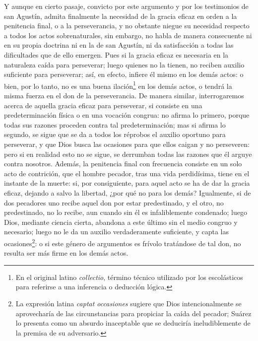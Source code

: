 \documentclass{article}
\begin{document}
Y aunque en cierto pasaje, convicto por este argumento y por los testimonios de san
Agustín, admita finalmente la necesidad de la gracia eficaz en orden a la penitencia
final, o a la perseverancia, y no obstante niegue su necesidad respecto a todos los
actos sobrenaturales, sin embargo, no habla de manera consecuente ni en su propia
doctrina ni en la de san Agustín, ni da satisfacción a todas las dificultades que de
ello emergen. Pues si la gracia eficaz es necesaria en la naturaleza caída para
perseverar; luego quienes no la tienen, no reciben auxilio suficiente para perseverar;
así, en efecto, infiere él mismo en los demás actos: o bien, por lo tanto, no es una
buena ilación\footnote{En el original latino \textit{collectio}, término técnico
utilizado por los escolásticos para referirse a una inferencia o deducción lógica.} en
los demás actos, o tendrá la misma fuerza en el don de la perseverancia. De manera
similar, interrogaremos acerca de aquella gracia eficaz para perseverar, si consiste en
una predeterminación física o en una vocación congrua: no afirma lo primero, porque
todas sus razones proceden contra tal predeterminación; mas si afirma lo segundo, se
sigue que se da a todos los réprobos el auxilio oportuno para perseverar, y que Dios
busca las ocasiones para que ellos caigan y no perseveren: pero si en realidad esto no
se sigue, se derrumban todas las razones que él arguye contra nosotros. Además, la
penitencia final con frecuencia consiste en un solo acto de contrición, que el hombre
pecador, tras una vida perdidísima, tiene en el instante de la muerte: si, por
consiguiente, para aquel acto se ha de dar la gracia eficaz, dejando a salvo la
libertad, ¿por qué no para los demás? Igualmente, si de dos pecadores uno recibe aquel
don por estar predestinado, y el otro, no predestinado, no lo recibe, aun cuando sin él
es infaliblemente condenado; luego Dios, mediante ciencia cierta, abandona a este último
sin el medio congruo y necesario; luego no le da un auxilio verdaderamente suficiente,
y capta las ocasiones\footnote{La expresión latina \textit{captat occasiones} sugiere
que Dios intencionalmente se aprovecharía de las circunstancias para propiciar la caída
del pecador; Suárez lo presenta como un absurdo inaceptable que se deduciría
ineludiblemente de la premisa de su adversario.}: o si este género de argumentos es
frívolo tratándose de tal don, no resulta ser más firme en los demás actos.
\end{document}
